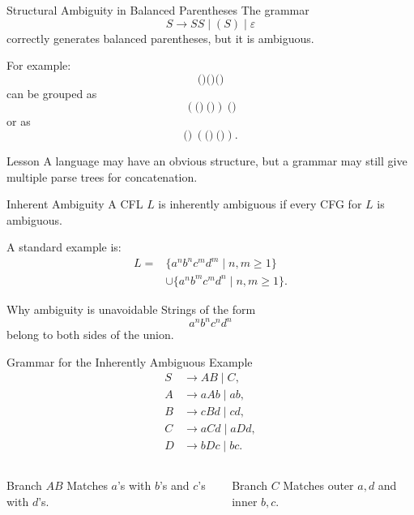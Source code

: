 \documentclass[aspectratio=169,10pt]{beamer}
\newcommand{\eps}{\varepsilon}
\newcommand{\code}[1]{\texttt{#1}}
\begin{document}
\begin{frame}{Structural Ambiguity in Balanced Parentheses}
\small
The grammar
\[
S\to SS\mid(S)\mid\eps
\]
correctly generates balanced parentheses, but it is ambiguous.

For example:
\[
\code{()()()}
\]
can be grouped as
\[
(\code{()}\ \code{()})\ \code{()}
\]
or as
\[
\code{()}\ (\code{()}\ \code{()}).
\]

\begin{alertblock}{Lesson}
A language may have an obvious structure, but a grammar may still give multiple parse trees for concatenation.
\end{alertblock}
\end{frame}

\begin{frame}{Inherent Ambiguity}
\small
A CFL \(L\) is \alert{inherently ambiguous} if every CFG for \(L\) is ambiguous.

A standard example is:
\[
\begin{aligned}
L={}&\{a^n b^n c^m d^m\mid n,m\ge1\}\\
&\cup\{a^n b^m c^m d^n\mid n,m\ge1\}.
\end{aligned}
\]

\begin{block}{Why ambiguity is unavoidable}
Strings of the form
\[
a^n b^n c^n d^n
\]
belong to both sides of the union.
\end{block}
\end{frame}

\begin{frame}{Grammar for the Inherently Ambiguous Example}
\small
\[
\begin{aligned}
S&\to AB\mid C,\\
A&\to aAb\mid ab,\\
B&\to cBd\mid cd,\\
C&\to aCd\mid aDd,\\
D&\to bDc\mid bc.
\end{aligned}
\]

\begin{columns}[T,onlytextwidth]
\begin{block}{Branch \(AB\)}
Matches \(a\)'s with \(b\)'s and \(c\)'s with \(d\)'s.
\end{block}

\begin{exampleblock}{Branch \(C\)}
Matches outer \(a,d\) and inner \(b,c\).
\end{exampleblock}
\end{columns}
\end{frame}
\end{document}
